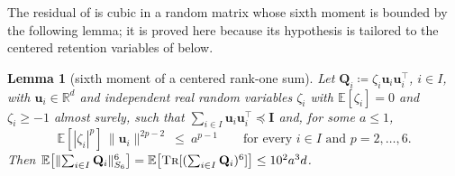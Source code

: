 \documentclass[11pt]{article}
\newtheorem{lemma}[theorem]{Lemma}
\theoremstyle{remark}
\newcommand{\II}{\mathbf I}
\newcommand{\QQ}{\mathbf Q}
\newcommand{\uu}{\mathbf u}
\newcommand{\R}{\mathbb R}
\newcommand{\defeq}{\coloneqq}
\newcommand{\Ex}{\mathbb E}
\newcommand{\norm}[1]{\lVert#1\rVert}
\newcommand{\tr}{\textsc{Tr}}
\begin{document}
The residual of  is cubic in a random matrix whose sixth
moment is bounded by the following lemma; it is proved here because its
hypothesis is tailored to the centered retention variables of
 below.
\begin{lemma}[sixth moment of a centered rank-one sum]
\label{lem:moment}
Let $\QQ_i\defeq\zeta_i\uu_i\uu_i^{\top}$, $i\in I$, with $\uu_i\in\R^{d}$
and independent real random variables $\zeta_i$ with $\Ex[\zeta_i]=0$ and
$\zeta_i\ge-1$ almost surely, such that
$\sum_{i\in I}\uu_i\uu_i^{\top}\preceq\II$ and, for some $a\le1$,
\[
\Ex[|\zeta_i|^{p}]\,\norm{\uu_i}^{2p-2}\ \le\ a^{p-1}
\qquad\text{for every }i\in I\text{ and }p=2,\dots,6 .
\]
Then
$\Ex\bigl[\norm{\sum_{i\in I}\QQ_i}_{S_6}^{6}\bigr]
=\Ex\bigl[\tr[(\sum_{i\in I}\QQ_i)^{6}]\bigr]\le10^{2}a^{3}d$.
\end{lemma}
\end{document}
